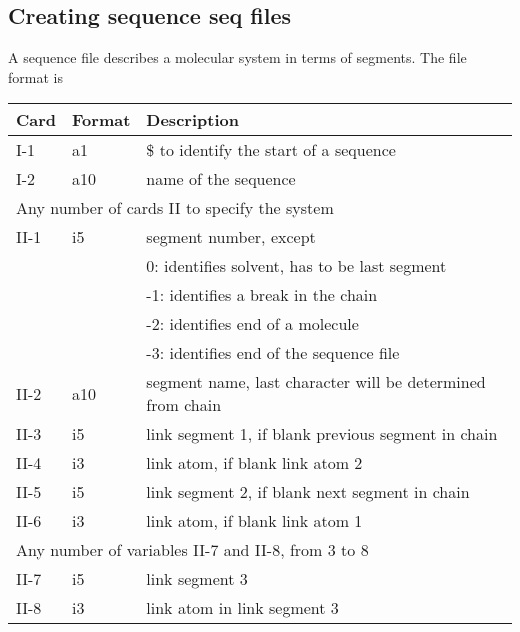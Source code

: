 \subsection{Creating sequence {\bf seq} files}
A sequence file describes a molecular system in terms of segments. The
file format is
\begin{center}
\begin{tabular}{lll}
\hline\hline
Card & Format & Description \\ \hline
I-1  & a1     & \$ to identify the start of a sequence \\
I-2  & a10    & name of the sequence\\
\multicolumn{3}{l}{Any number of cards II to specify the system} \\
II-1 & i5     & segment number, except\\
     &        &  0: identifies solvent, has to be last segment\\
     &        & -1: identifies a break in the chain\\
     &        & -2: identifies end of a molecule\\
     &        & -3: identifies end of the sequence file\\
II-2 & a10    & segment name, last character will be determined from chain\\
II-3 & i5     & link segment 1, if blank previous segment in chain\\
II-4 & i3     & link atom, if blank link atom 2\\
II-5 & i5     & link segment 2, if blank next segment in chain\\
II-6 & i3     & link atom, if blank link atom 1\\
\multicolumn{3}{l}{Any number of variables II-7 and II-8, from 3 to 8 } \\
II-7 & i5     & link segment 3\\
II-8 & i3     & link atom in link segment 3\\
\hline\hline
\end{tabular}
\end{center}
